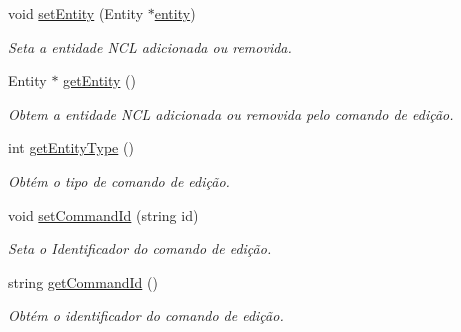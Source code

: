 \begin{DoxyCompactItemize}
void \hyperlink{classbr_1_1ufscar_1_1lince_1_1ginga_1_1wac_1_1editing_1_1EditingCommand_a3fea7b04ec69d0e6c45488728342859a}{setEntity} (Entity $\ast$\hyperlink{classbr_1_1ufscar_1_1lince_1_1ginga_1_1wac_1_1editing_1_1EditingCommand_a080922002fe90bf99390c026e8e99e52}{entity})
\begin{DoxyCompactList}\small\item\em Seta a entidade NCL adicionada ou removida. \item\end{DoxyCompactList}\item 
Entity $\ast$ \hyperlink{classbr_1_1ufscar_1_1lince_1_1ginga_1_1wac_1_1editing_1_1EditingCommand_a38477c48ab9f7b0cb7ca2fe6cf8b8ca7}{getEntity} ()
\begin{DoxyCompactList}\small\item\em Obtem a entidade NCL adicionada ou removida pelo comando de edição. \item\end{DoxyCompactList}\item 
int \hyperlink{classbr_1_1ufscar_1_1lince_1_1ginga_1_1wac_1_1editing_1_1EditingCommand_aaf9cd154148d3c9022e9aefe21fb1ff9}{getEntityType} ()
\begin{DoxyCompactList}\small\item\em Obtém o tipo de comando de edição. \item\end{DoxyCompactList}\item 
void \hyperlink{classbr_1_1ufscar_1_1lince_1_1ginga_1_1wac_1_1editing_1_1EditingCommand_aee78eb520e1901f64e526034bcf0ad6c}{setCommandId} (string id)
\begin{DoxyCompactList}\small\item\em Seta o Identificador do comando de edição. \item\end{DoxyCompactList}\item 
string \hyperlink{classbr_1_1ufscar_1_1lince_1_1ginga_1_1wac_1_1editing_1_1EditingCommand_a014a96ee0631de12234767798f8662c7}{getCommandId} ()
\begin{DoxyCompactList}\small\item\em Obtém o identificador do comando de edição. \item\end{DoxyCompactList}\end{DoxyCompactItemize}
